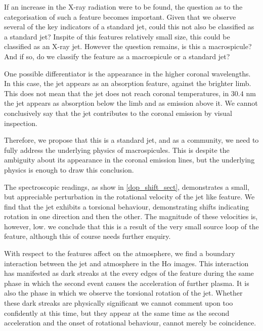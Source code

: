 If an increase in the X-ray radiation were to be found, the question as to the categorisation of such a feature becomes important.
Given that we observe several of the key indicators of a standard jet, could this not also be classified as a standard jet? 
Inspite of this features relatively small size, this could be classified as an X-ray jet.
However the question remains, is this a macrospicule?
And if so, do we classify the feature as a macrospicule or a standard jet?

One possible differentiator is the appearance in the higher coronal wavelengths.
In this case, the jet appears as an absorption feature, against the brighter limb.
This does not mean that the jet does not reach coronal temperatures, in $30.4$ nm the jet appears as absorption below the limb and as emission above it.
We cannot conclusively say that the jet contributes to the coronal emission by visual inspection.

Therefore, we propose that this is a standard jet, and as a community, we need to fully address the underlying physics of macrospicules.
This is despite the ambiguity about its appearance in the coronal emission lines, but the underlying physics is enough to draw this conclusion.

The spectroscopic readings, as show in \cref{dop_shift_sect}, demonstrates a small, but appreciable perturbation in the rotational velocity of the jet like feature.
We find that the jet exhibits a torsional behaviour, demonstrating shifts indicating rotation in one direction and then the other.
The magnitude of these velocities is, however, low.
we conclude that this is a result of the very small source loop of the feature, although this of course needs further enquiry. 

With respect to the features affect on the atmosphere, we find a boundary interaction between the jet and atmosphere in the H$\alpha$ images.
This interaction has manifested as dark streaks at the every edges of the feature during the same phase in which the second event causes the acceleration of further plasma.
It is also the phase in which we observe the torsional rotation of the jet.
Whether these dark streaks are physically significant we cannot comment upon too confidently at this time, but they appear at the same time as the second acceleration and the onset of rotational behaviour, cannot merely be coincidence.
